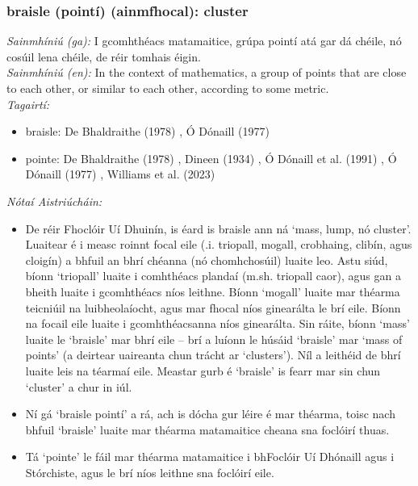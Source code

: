 \documentclass{article}
\begin{document}
\subsubsection*{braisle (pointí) (ainmfhocal): cluster}
 \noindent \textit{Sainmhíniú (ga):} I gcomhthéacs matamaitice, grúpa pointí atá gar dá chéile, nó cosúil lena chéile, de réir tomhais éigin.
\\
 \noindent \textit{Sainmhíniú (en):} In the context of mathematics, a group of points that are close to each other, or similar to each other, according to some metric.
\\
 \noindent \textit{Tagairtí:}
\begin{itemize}
	\item braisle: De Bhaldraithe (1978) \cite{de-bhaldraithe}, Ó Dónaill (1977) \cite{odonaill}
	\item pointe: De Bhaldraithe (1978) \cite{de-bhaldraithe}, Dineen (1934) \cite{dineen}, Ó Dónaill et al. (1991) \cite{focloir-beag}, Ó Dónaill (1977) \cite{odonaill}, Williams et al. (2023) \cite{storchiste}
\end{itemize}

 \noindent \textit{Nótaí Aistriúcháin:}
\begin{itemize}
	\item De réir Fhoclóir Uí Dhuinín, is éard is braisle ann ná `mass, lump, nó cluster'. Luaitear é i measc roinnt focal eile (.i. triopall, mogall, crobhaing, clibín, agus cloigín) a bhfuil an bhrí chéanna (nó chomhchosúil) luaite leo. Astu siúd, bíonn `triopall' luaite i comhthéacs plandaí (m.sh. triopall caor), agus gan a bheith luaite i gcomhthéacs níos leithne. Bíonn `mogall' luaite mar théarma teicniúil na luibheolaíocht, agus mar fhocal níos ginearálta le brí eile. Bíonn na focail eile luaite i gcomhthéacsanna níos ginearálta. Sin ráite, bíonn `mass' luaite le `braisle' mar bhrí eile -- brí a luíonn le húsáid `braisle' mar `mass of points' (a deirtear uaireanta chun trácht ar `clusters'). Níl a leithéid de bhrí luaite leis na téarmaí eile. Meastar gurb é `braisle' is fearr mar sin chun `cluster' a chur in iúl.
	\item Ní gá `braisle pointí' a rá, ach is dócha gur léire é mar théarma, toisc nach bhfuil `braisle' luaite mar théarma matamaitice cheana sna foclóirí thuas.
	\item Tá `pointe' le fáil mar théarma matamaitice i bhFoclóir Uí Dhónaill agus i Stórchiste, agus le brí níos leithne sna foclóirí eile.
\end{itemize}
\end{document}
